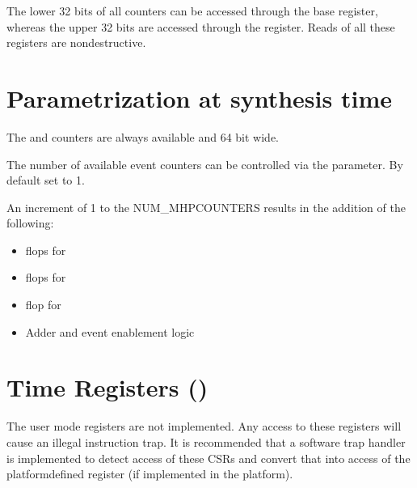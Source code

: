 \documentclass[letterpaper,10pt,english]{sphinxmanual}
\begin{document}
\sphinxAtStartPar
The lower 32 bits of all counters can be accessed through the base register, whereas the upper 32 bits are accessed through the \sphinxhyphen{}register.
Reads of all these registers are non\sphinxhyphen{}destructive.


\section{Parametrization at synthesis time}
\label{\detokenize{perf_counters:parametrization-at-synthesis-time}}
\sphinxAtStartPar
The  and  counters are always available and 64 bit wide.

\sphinxAtStartPar
The number of available event counters  can be controlled via the  parameter.
By default  set to 1.

\sphinxAtStartPar
An increment of 1 to the NUM\_MHPCOUNTERS results in the addition of the following:
\begin{itemize}
\item {} 
 flops for 

\item {} 
 flops for 

\item {} 
 flop  for 

\item {} 
\sphinxAtStartPar
Adder and event enablement logic

\end{itemize}


\section{Time Registers ()}
\label{\detokenize{perf_counters:time-registers-time-h}}
\sphinxAtStartPar
The user mode  registers are not implemented. Any access to these
registers will cause an illegal instruction trap. It is recommended that a software trap handler is
implemented to detect access of these CSRs and convert that into access of the
platform\sphinxhyphen{}defined  register (if implemented in the platform).
\end{document}
